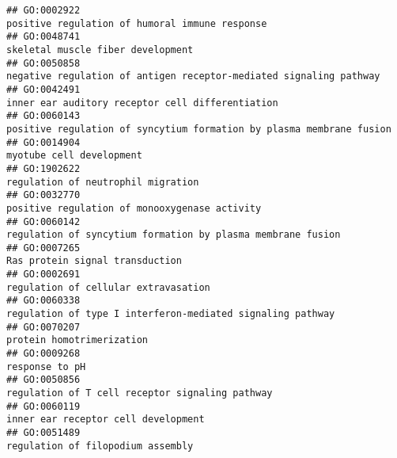 \documentclass[
]{article}
\begin{document}
\begin{verbatim}
## GO:0002922                                                                                                   positive regulation of humoral immune response
## GO:0048741                                                                                                                skeletal muscle fiber development
## GO:0050858                                                                               negative regulation of antigen receptor-mediated signaling pathway
## GO:0042491                                                                                                 inner ear auditory receptor cell differentiation
## GO:0060143                                                                             positive regulation of syncytium formation by plasma membrane fusion
## GO:0014904                                                                                                                         myotube cell development
## GO:1902622                                                                                                               regulation of neutrophil migration
## GO:0032770                                                                                                    positive regulation of monooxygenase activity
## GO:0060142                                                                                      regulation of syncytium formation by plasma membrane fusion
## GO:0007265                                                                                                                  Ras protein signal transduction
## GO:0002691                                                                                                             regulation of cellular extravasation
## GO:0060338                                                                                       regulation of type I interferon-mediated signaling pathway
## GO:0070207                                                                                                                        protein homotrimerization
## GO:0009268                                                                                                                                   response to pH
## GO:0050856                                                                                                  regulation of T cell receptor signaling pathway
## GO:0060119                                                                                                              inner ear receptor cell development
## GO:0051489                                                                                                                regulation of filopodium assembly

\end{verbatim}
\end{document}
